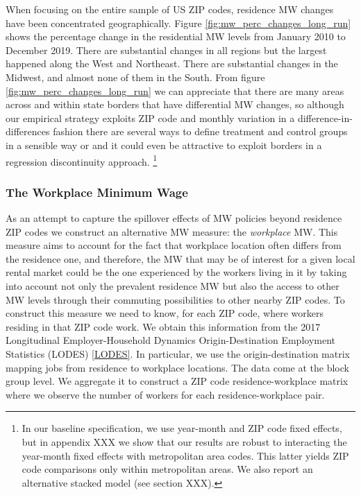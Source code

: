 When focusing on the entire sample of US ZIP codes, residence MW changes have been concentrated 
geographically. Figure \ref{fig:mw_perc_changes_long_run} shows the percentage change in the 
residential MW levels from January 2010 to December 2019. There are substantial changes 
in all regions but the largest happened along the West and Northeast. There are substantial 
changes in the Midwest, and almost none of them in the South. From figure 
\ref{fig:mw_perc_changes_long_run} we can appreciate that there are many areas across 
and within state borders that have differential MW changes, so although our empirical strategy 
exploits ZIP code and monthly variation in a difference-in-differences fashion there are several 
ways to define treatment and control groups in a sensible way or and it could even be attractive 
to exploit borders in a regression discontinuity approach.
	\footnote{In our baseline specification, we use year-month and ZIP code fixed effects, but in 
	appendix XXX we show that our results are robust to interacting the year-month fixed effects
    with metropolitan area codes. This latter yields ZIP code comparisons only within metropolitan areas.
    We also report an alternative stacked model (see section XXX).} 


\subsubsection{The Workplace Minimum Wage}

As an attempt to capture the spillover effects of MW policies beyond residence ZIP codes 
we construct an alternative MW measure: the \textit{workplace} MW. 
This measure aims to account for the fact that workplace location 
often differs from the residence one, and therefore, the MW that may be of interest for 
a given local rental market could be the one experienced by the workers living in it by taking
into account not only the prevalent residence MW but also the access to other MW levels through
their commuting possibilities to other nearby ZIP codes. To construct this measure we need to 
know, for each ZIP code, where workers residing in that ZIP code work. We obtain this 
information from the 2017 Longitudinal Employer-Household Dynamics Origin-Destination 
Employment Statistics (LODES) \ref{LODES}. In particular, we use the origin-destination matrix mapping 
jobs from residence to workplace locations. The data come at the block group level. 
We aggregate it to construct a ZIP code residence-workplace matrix where we observe 
the number of workers for each residence-workplace pair.

